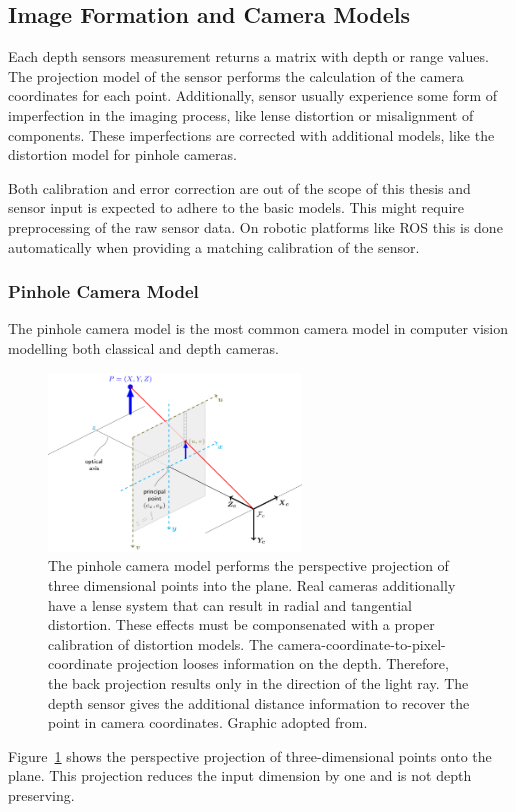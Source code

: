 \subsection{Image Formation and Camera Models}

Each depth sensors measurement returns a matrix with depth or range values.
The projection model of the sensor performs the calculation of the camera coordinates for each point.
Additionally, sensor usually experience some form of imperfection in the imaging process, like lense distortion or misalignment of components.
These imperfections are corrected with additional models, like the distortion model for pinhole cameras.

Both calibration and error correction are out of the scope of this thesis and sensor input is expected to adhere to the basic models.
This might require preprocessing of the raw sensor data.
On robotic platforms like \acrlong{ROS} this is done automatically when providing a matching calibration of the sensor.

\subsubsection{Pinhole Camera Model}

The pinhole camera model is the most common camera model in computer vision modelling both classical and depth cameras.

\begin{figure}[H]
    \includegraphics[width=0.6\textwidth]{chapter03/img/pinhole_camera_model.png}
    \caption{The pinhole camera model performs the perspective projection of three dimensional points into the plane. Real cameras additionally have a lense system that can result in radial and tangential distortion. These effects must be componsenated with a proper calibration of distortion models. The camera-coordinate-to-pixel-coordinate projection looses information on the depth. Therefore, the back projection results only in the direction of the light ray. The depth sensor gives the additional distance information to recover the point in camera coordinates. Graphic adopted from\cite{opencv_pinhole}.}\label{fig:pinhole_model}
\end{figure}
Figure~\ref{fig:pinhole_model} shows the perspective projection of three-dimensional points onto the plane.
This projection reduces the input dimension by one and is not depth preserving.

